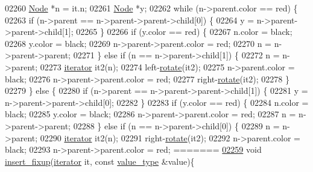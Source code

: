 \begin{DoxyCode}
02260                 \hyperlink{structaed2_1_1iterator_1_1Node}{Node} *n = it.n;
02261                 \hyperlink{structaed2_1_1iterator_1_1Node}{Node} *y;
02262                 \textcolor{keywordflow}{while} (n->parent.color == red) \{
02263                     \textcolor{keywordflow}{if} (n->parent == n->parent->parent->child[0]) \{
02264                         y = n->parent->parent->child[1];
02265                     \}
02266                     \textcolor{keywordflow}{if} (y.color == red) \{
02267                         n.color = black;
02268                         y.color = black;
02269                         n->parent->parent.color = red;
02270                         n = n->parent->parent;
02271                     \} \textcolor{keywordflow}{else} \textcolor{keywordflow}{if} (n == n->parent->child[1]) \{
02272                         n = n->parent;
02273                         \hyperlink{classaed2_1_1iterator_1_1iterator}{iterator} it2(n);
02274                         left-\hyperlink{classaed2_1_1iterator_af4e447a081108196ecdf39b16ecb5303_af4e447a081108196ecdf39b16ecb5303}{rotate}(it2);
02275                         n->parent.color = black;
02276                         n->parent->parent.color = red;
02277                         right-\hyperlink{classaed2_1_1iterator_af4e447a081108196ecdf39b16ecb5303_af4e447a081108196ecdf39b16ecb5303}{rotate}(it2);
02278                     \}
02279                 \} \textcolor{keywordflow}{else} \{
02280                     \textcolor{keywordflow}{if} (n->parent == n->parent->parent->child[1]) \{
02281                         y = n->parent->parent->child[0];
02282                     \}
02283                     \textcolor{keywordflow}{if} (y.color == red) \{
02284                         n.color = black;
02285                         y.color = black;
02286                         n->parent->parent.color = red;
02287                         n = n->parent->parent;
02288                     \} \textcolor{keywordflow}{else} \textcolor{keywordflow}{if} (n == n->parent->child[0]) \{
02289                         n = n->parent;
02290                         \hyperlink{classaed2_1_1iterator_1_1iterator}{iterator} it2(n);
02291                         right-\hyperlink{classaed2_1_1iterator_af4e447a081108196ecdf39b16ecb5303_af4e447a081108196ecdf39b16ecb5303}{rotate}(it2);
02292                         n->parent.color = black;
02293                         n->parent->parent.color = red;
=======
\hyperlink{classaed2_1_1iterator_ab23378eb6149357e1a2167e9804eb6e3_ab23378eb6149357e1a2167e9804eb6e3}{02259}             \textcolor{keywordtype}{void} \hyperlink{classaed2_1_1iterator_ab23378eb6149357e1a2167e9804eb6e3_ab23378eb6149357e1a2167e9804eb6e3}{insert\_fixup}(\hyperlink{classaed2_1_1iterator_1_1iterator}{iterator} it, \textcolor{keyword}{const} \hyperlink{classaed2_1_1iterator_a6411a2c08b2b7c52f063bef1a168acb6_a6411a2c08b2b7c52f063bef1a168acb6}{value\_type} &value)\{

\end{DoxyCode}
